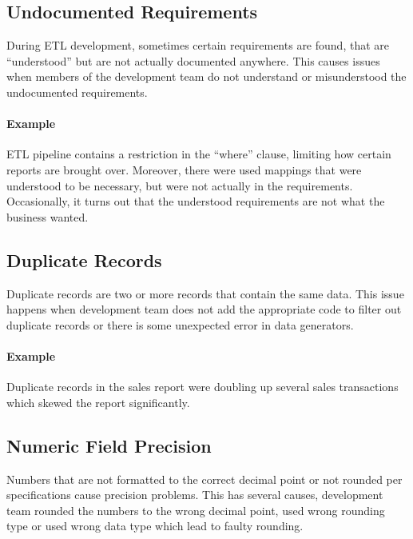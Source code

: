 \subsection*{Undocumented Requirements}

During ETL development, sometimes certain requirements are found, that are \enquote{understood} but are not actually documented anywhere.
This causes issues when members of the development team do not understand or misunderstood the undocumented requirements.

\paragraph*{Example} ETL pipeline contains a restriction in the \enquote{where} clause, limiting how certain reports are brought over.
Moreover, there were used mappings that were understood to be necessary, but were not actually in the requirements.
Occasionally, it turns out that the understood requirements are not what the business wanted.

\subsection*{Duplicate Records}

Duplicate records are two or more records that contain the same data.
This issue happens when development team does not add the appropriate code to filter out duplicate records or there is some unexpected error in data generators.

\paragraph*{Example} Duplicate records in the sales report were doubling up several sales transactions which skewed the report significantly.


\subsection*{Numeric Field Precision}

Numbers that are not formatted to the correct decimal point or not rounded per specifications cause precision problems.
This has several causes, development team rounded the numbers to the wrong decimal point, used wrong rounding type or used wrong data type which lead to faulty rounding.


